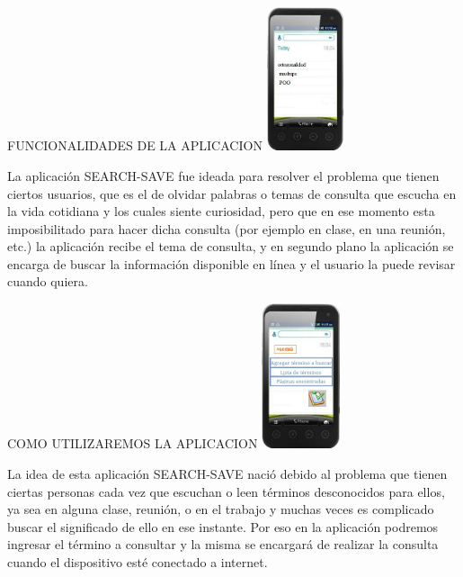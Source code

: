 \documentclass{beamer}
\begin{document}
	\begin{frame}{FUNCIONALIDADES DE LA APLICACION}
		\centering
  		\includegraphics[totalheight=1.4in,width=0.9in]{lt}
  		\begin{block}{}
  		La aplicación SEARCH-SAVE fue ideada para resolver el problema que tienen ciertos usuarios, que es el de olvidar palabras o temas de consulta que escucha en la vida cotidiana y los cuales siente curiosidad, pero que en ese momento esta imposibilitado para hacer dicha consulta (por ejemplo en clase, en una reunión, etc.) la aplicación recibe el tema de consulta, y en segundo plano la aplicación se encarga de buscar la información disponible en línea y el usuario la puede revisar cuando quiera.
  		\end{block}				
	\end{frame}
	
  	\begin{frame}{COMO UTILIZAREMOS LA APLICACION}
  		\centering
  		\includegraphics[totalheight=1.4in,width=0.9in]{menu}	
  		\begin{block}{}
  		La idea de esta aplicación SEARCH-SAVE nació debido al problema que tienen ciertas personas cada vez que escuchan o leen términos desconocidos para ellos, ya sea en alguna clase, reunión, o en el trabajo y muchas veces es complicado buscar el significado de ello en ese instante. Por eso en  la aplicación podremos ingresar el término a consultar y la misma se encargará de realizar la consulta cuando el dispositivo esté conectado a internet.
  		\end{block}				
	\end{frame}
	
\end{document}
